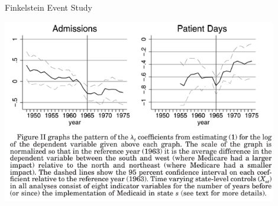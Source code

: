 \documentclass[11pt, english]{beamer}
\begin{document}
	\begin{frame}{Finkelstein Event Study}
		\vspace{-0.1cm}
		\begin{center}
			\includegraphics[width=0.9\textwidth]{figures/fink.png}
		\end{center}
	\end{frame}
\end{document}
